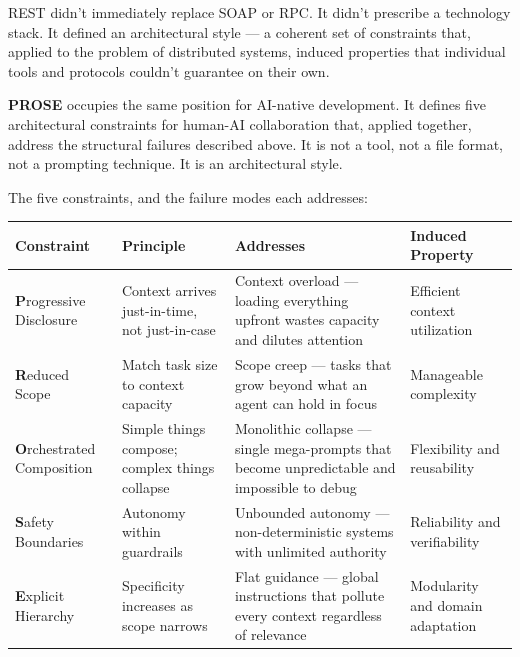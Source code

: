\documentclass[
  a4paper,
  DIV=11,
  numbers=noendperiod]{scrreprt}
\newcounter{none} %
\begin{document}
REST didn't immediately replace SOAP or RPC. It didn't prescribe a
technology stack. It defined an architectural style --- a coherent set
of constraints that, applied to the problem of distributed systems,
induced properties that individual tools and protocols couldn't
guarantee on their own.

\textbf{PROSE} occupies the same position for AI-native development. It
defines five architectural constraints for human-AI collaboration that,
applied together, address the structural failures described above. It is
not a tool, not a file format, not a prompting technique. It is an
architectural style.

The five constraints, and the failure modes each addresses:

{\def\LTcaptype{none} %
\begin{longtable}[]{@{}
  >{\raggedright\arraybackslash}p{}
  >{\raggedright\arraybackslash}p{}
  >{\raggedright\arraybackslash}p{}
  >{\raggedright\arraybackslash}p{}@{}}
\toprule\noalign{}
\begin{minipage}[b]{\linewidth}\raggedright
Constraint
\end{minipage} & \begin{minipage}[b]{\linewidth}\raggedright
Principle
\end{minipage} & \begin{minipage}[b]{\linewidth}\raggedright
Addresses
\end{minipage} & \begin{minipage}[b]{\linewidth}\raggedright
Induced Property
\end{minipage} \\
\midrule\noalign{}
\endhead
\bottomrule\noalign{}
\endlastfoot
\textbf{P}rogressive Disclosure & Context arrives just-in-time, not
just-in-case & Context overload --- loading everything upfront wastes
capacity and dilutes attention & Efficient context utilization \\
\textbf{R}educed Scope & Match task size to context capacity & Scope
creep --- tasks that grow beyond what an agent can hold in focus &
Manageable complexity \\
\textbf{O}rchestrated Composition & Simple things compose; complex
things collapse & Monolithic collapse --- single mega-prompts that
become unpredictable and impossible to debug & Flexibility and
reusability \\
\textbf{S}afety Boundaries & Autonomy within guardrails & Unbounded
autonomy --- non-deterministic systems with unlimited authority &
Reliability and verifiability \\
\textbf{E}xplicit Hierarchy & Specificity increases as scope narrows &
Flat guidance --- global instructions that pollute every context
regardless of relevance & Modularity and domain adaptation \\
\end{longtable}
}
\end{document}
